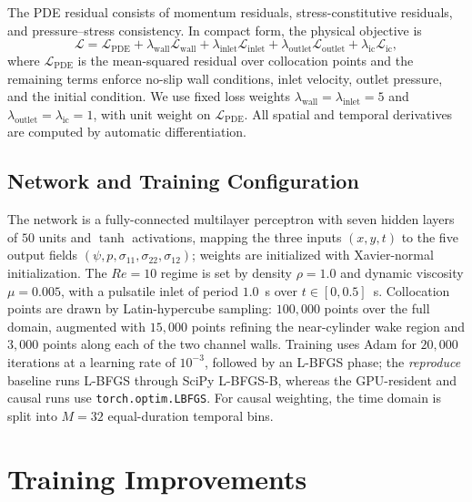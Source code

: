 \documentclass{article}
\begin{document}
The PDE residual consists of momentum residuals, stress-constitutive residuals, and pressure--stress consistency. In compact form, the physical objective is
\begin{equation}
    \mathcal{L}
    = \mathcal{L}_{\mathrm{PDE}}
    + \lambda_{\mathrm{wall}}\mathcal{L}_{\mathrm{wall}}
    + \lambda_{\mathrm{inlet}}\mathcal{L}_{\mathrm{inlet}}
    + \lambda_{\mathrm{outlet}}\mathcal{L}_{\mathrm{outlet}}
    + \lambda_{\mathrm{ic}}\mathcal{L}_{\mathrm{ic}},
\end{equation}
where $\mathcal{L}_{\mathrm{PDE}}$ is the mean-squared residual over collocation points and the remaining terms enforce no-slip wall conditions, inlet velocity, outlet pressure, and the initial condition. We use fixed loss weights $\lambda_{\mathrm{wall}}=\lambda_{\mathrm{inlet}}=5$ and $\lambda_{\mathrm{outlet}}=\lambda_{\mathrm{ic}}=1$, with unit weight on $\mathcal{L}_{\mathrm{PDE}}$. All spatial and temporal derivatives are computed by automatic differentiation.

\subsection{Network and Training Configuration}
\label{sec:config}

The network is a fully-connected multilayer perceptron with seven hidden layers of $50$ units and $\tanh$ activations, mapping the three inputs $(x,y,t)$ to the five output fields $(\psi,p,\sigma_{11},\sigma_{22},\sigma_{12})$; weights are initialized with Xavier-normal initialization. The $Re=10$ regime is set by density $\rho=1.0$ and dynamic viscosity $\mu=0.005$, with a pulsatile inlet of period $1.0$~s over $t\in[0,0.5]$~s. Collocation points are drawn by Latin-hypercube sampling: $100{,}000$ points over the full domain, augmented with $15{,}000$ points refining the near-cylinder wake region and $3{,}000$ points along each of the two channel walls. Training uses Adam for $20{,}000$ iterations at a learning rate of $10^{-3}$, followed by an L-BFGS phase; the \emph{reproduce} baseline runs L-BFGS through SciPy L-BFGS-B, whereas the GPU-resident and causal runs use \texttt{torch.optim.LBFGS}. For causal weighting, the time domain is split into $M=32$ equal-duration temporal bins.

\section{Training Improvements}
\end{document}
